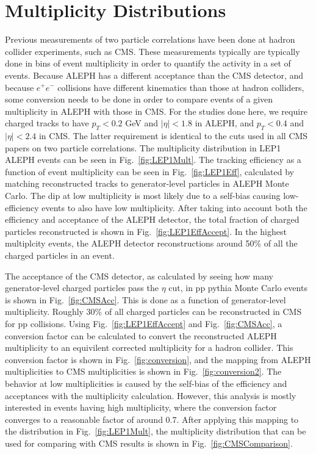 \FloatBarrier
\section{Multiplicity Distributions}

Previous measurements of two particle correlations have been done at hadron collider experiments, such as CMS.  These measurements typically are typically done in bins of event multiplicity in order to quantify the activity in a set of events.  Because ALEPH has a different acceptance than the CMS detector, and because $e^{+}e^{-}$ collisions have different kinematics than those at hadron colliders, some conversion needs to be done in order to compare events of a given multiplicity in ALEPH with those in CMS.  For the studies done here, we require charged tracks to have $p_{T}<0.2$ GeV and $|\eta|<1.8$ in ALEPH, and $p_{T}<0.4$ and $|\eta|<2.4$ in CMS.  The latter requirement is identical to the cuts used in all CMS papers on two particle correlations.  The multiplicity distribution in LEP1 ALEPH events can be seen in Fig.~\ref{fig:LEP1Mult}.  The tracking efficiency as a function of event multiplicity can be seen in Fig.~\ref{fig:LEP1Eff}, calculated by matching reconstructed tracks to generator-level particles in ALEPH Monte Carlo.  The dip at low multiplicity is most likely due to a self-bias causing low-efficiency events to also have low multiplicity.  After taking into account both the efficiency and acceptance of the ALEPH detector, the total fraction of charged particles reconstructed is shown in Fig.~\ref{fig:LEP1EffAccept}.  In the highest multiplcity events, the ALEPH detector reconstructions around 50\% of all the charged particles in an event.

The acceptance of the CMS detector, as calculated by seeing how many generator-level charged particles pass the
$\eta$ cut, in pp pythia Monte Carlo events is shown in Fig.~\ref{fig:CMSAcc}.  This is done as a function of generator-level multiplicity.  Roughly 30\% of all charged particles can be reconstructed in CMS for pp collisions.  Using Fig.~\ref{fig:LEP1EffAccept} and Fig.~\ref{fig:CMSAcc}, a conversion factor can be calculated to convert the reconstructed ALEPH multiplicity to an equivilent corrected multiplicity for a hadron collider.  This conversion factor is shown in Fig.~\ref{fig:conversion}, and the mapping from ALEPH multiplicities to CMS multiplicities is shown in Fig.~\ref{fig:conversion2}.  The behavior at low multiplicities is caused by the self-bias of the efficiency and acceptances with the multiplicity calculation.  However, this analysis is mostly interested in events having high multiplicity, where the conversion factor converges to a reasonable factor of around 0.7.  After applying this mapping to the distribution in Fig.~\ref{fig:LEP1Mult}, the multiplicity distribution that can be used for comparing with CMS results is shown in Fig.~\ref{fig:CMSComparison}.

